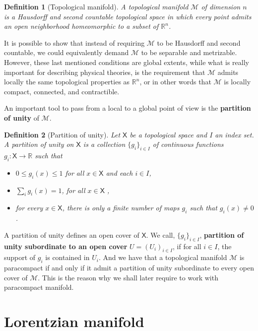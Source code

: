 \documentclass[11pt]{book}
\newcommand{\Mcal}{\mathcal{M}}
\newcommand{\Rbb}{\mathbb{R}}
\newcommand{\Xsf}{\mathsf{X}}
\theoremstyle{break}
\newtheorem{definition}{Definition}[chapter]
\begin{document}
\bigskip


\begin{definition}[Topological manifold]
A topological manifold $\Mcal$ of dimension $n$ is a Hausdorff and second countable topological space in which every point admits an open neighborhood homeomorphic to a subset of $\Rbb^n$.
\end{definition}


It is possible to show that instead of requiring $\Mcal$ to be Hausdorff and second countable, we could equivalently demand $\Mcal$ to be separable and metrizable. However, these last mentioned conditions are global extents, while what is really important for describing physical theories, is the requirement that $\Mcal$ admits locally the same topological properties as $\Rbb^n$, or in other words that  $\Mcal$ is locally compact, connected, and contractible.


An important tool to pass from a local to a global point of view is the \textbf{partition of unity} of $\Mcal$. 


\begin{definition}[Partition of unity]
Let $\Xsf$ be a topological space and $I$ an index set. A partition of unity on $\Xsf$ is a collection $\{g_i\}_{i\in I}$ of continuous functions $g_i : \Xsf \to \Rbb$ such that
%
\begin{itemize}
\item $0 \leq g_i(x) \leq 1$ for all $x \in \Xsf$ and each $i\in I$,
\item $\sum_i g_i(x) = 1$, for all $x \in \Xsf$ ,
\item for every $x \in \Xsf$, there is only a finite number of maps $g_i$ such that $g_i(x) \neq 0$.
\end{itemize}
%
\end{definition}


A partition of unity defines an open cover of $\Xsf$. We call, $\{g_i\}_{i \in I}$, \textbf{partition of unity subordinate to an open cover} $U=(U_i)_{i \in I}$, if for all $i \in I$, the support of $g_i$ is contained in $U_i$. And we have that a topological manifold $\Mcal$ is paracompact if and only if it admit a partition of unity subordinate to every open cover of $\Mcal$. This is the reason why we shall later require to work with paracompact manifold.


\section{Lorentzian manifold}
\label{p:LORENTZ_M}
\end{document}
